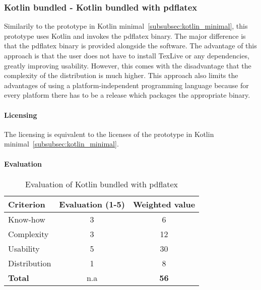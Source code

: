 \subsubsection{Kotlin bundled - Kotlin bundled with pdflatex}
\label{sec:kotlin_bundled}
Similarily to the prototype in Kotlin minimal~\ref{subsubsec:kotlin_minimal}, this prototype uses Kotlin and invokes the pdflatex binary.
The major difference is that the pdflatex binary is provided alongside
the software.
The advantage of this approach is that the user does not have to install TexLive or any dependencies, greatly improving usability.
However, this comes with the disadvantage that the complexity of the distribution is much higher.
This approach also limits the advantages of using a platform-independent programming language because for every platform there has to be a release
which packages the appropriate binary.

\paragraph{Licensing}\mbox{}\newline
The licensing is equivalent to the licenses of the prototype in Kotlin minimal~\ref{subsubsec:kotlin_minimal}.

\paragraph{Evaluation}\mbox{}\newline
\begin{table}[H]
    \centering
    \begin{tabular}{|l|c|c|}
        \hline
        \textbf{Criterion} & \textbf{Evaluation (1-5)} & \textbf{Weighted value} \\
        \hline
        Know-how & 3 & 6 \\
        \hline
        Complexity & 3 & 12 \\
        \hline
        Usability & 5 & 30 \\
        \hline
        Distribution & 1 & 8 \\
        \hline
        \textbf{Total} & n.a & \textbf{56} \\
        \hline
    \end{tabular}
    \caption{Evaluation of Kotlin bundled with pdflatex}
    \label{table:kotlin_bundled_evaluation}
\end{table}

